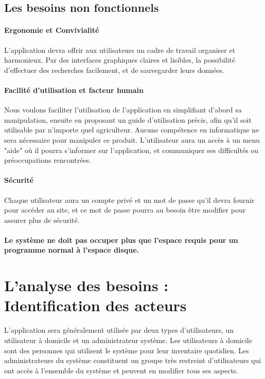 \subsection{Les besoins non fonctionnels}
\paragraph{Ergonomie et Convivialité}
L’application devra offrir aux utilisateurs un cadre de travail organiser et harmonieux. Par des interfaces graphiques claires et lisibles, la possibilité d’effectuer des recherches facilement, et de sauvegarder leurs données.

\paragraph{Facilité d’utilisation et facteur humain}
Nous voulons faciliter l’utilisation de l’application en simplifiant d’abord sa manipulation, ensuite en proposant un guide d’utilisation précis, afin qu’il soit utilisable par n’importe quel agriculteur. Aucune compétence en informatique ne sera nécessaire pour manipuler ce produit. L’utilisateur aura un accès à un menu "aide" où il pourra s’informer sur l’application, et communiquer ses difficultés ou préoccupations rencontrées.

\paragraph{Sécurité}
Chaque utilisateur aura un compte privé et un mot de passe qu’il devra fournir pour accéder au site, et ce mot de passe pourra au besoin être modifier pour assurer plus de sécurité.

\paragraph{Le système ne doit pas occuper plus que l'espace requis pour un programme normal à l'espace disque.}


\section{L’analyse des besoins : Identification des acteurs}
L'application sera généralement utilisée par deux types d'utilisateurs, un utilisateur à domicile et un administrateur système. Les utilisateurs à domicile sont des personnes qui utilisent le système pour leur inventaire quotidien. Les administrateurs du système constituent un groupe très restreint d'utilisateurs qui ont accès à l'ensemble du système et peuvent en modifier tous ses aspects.


